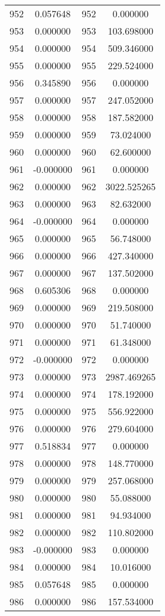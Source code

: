 \documentclass[12pt]{article}
\begin{document}
\begin{longtable}{@{}cccc@{}}
952 & 0.057648 & 952 & 0.000000 \\
953 & 0.000000 & 953 & 103.698000 \\
954 & 0.000000 & 954 & 509.346000 \\
955 & 0.000000 & 955 & 229.524000 \\
956 & 0.345890 & 956 & 0.000000 \\
957 & 0.000000 & 957 & 247.052000 \\
958 & 0.000000 & 958 & 187.582000 \\
959 & 0.000000 & 959 & 73.024000 \\
960 & 0.000000 & 960 & 62.600000 \\
961 & -0.000000 & 961 & 0.000000 \\
962 & 0.000000 & 962 & 3022.525265 \\
963 & 0.000000 & 963 & 82.632000 \\
964 & -0.000000 & 964 & 0.000000 \\
965 & 0.000000 & 965 & 56.748000 \\
966 & 0.000000 & 966 & 427.340000 \\
967 & 0.000000 & 967 & 137.502000 \\
968 & 0.605306 & 968 & 0.000000 \\
969 & 0.000000 & 969 & 219.508000 \\
970 & 0.000000 & 970 & 51.740000 \\
971 & 0.000000 & 971 & 61.348000 \\
972 & -0.000000 & 972 & 0.000000 \\
973 & 0.000000 & 973 & 2987.469265 \\
974 & 0.000000 & 974 & 178.192000 \\
975 & 0.000000 & 975 & 556.922000 \\
976 & 0.000000 & 976 & 279.604000 \\
977 & 0.518834 & 977 & 0.000000 \\
978 & 0.000000 & 978 & 148.770000 \\
979 & 0.000000 & 979 & 257.068000 \\
980 & 0.000000 & 980 & 55.088000 \\
981 & 0.000000 & 981 & 94.934000 \\
982 & 0.000000 & 982 & 110.802000 \\
983 & -0.000000 & 983 & 0.000000 \\
984 & 0.000000 & 984 & 10.016000 \\
985 & 0.057648 & 985 & 0.000000 \\
986 & 0.000000 & 986 & 157.534000 \\

\end{longtable}
\end{document}
